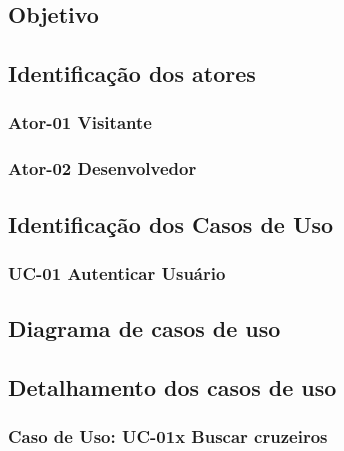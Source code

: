 \subsection{Objetivo}

\subsection{Identificação dos atores}

\subsubsection{Ator-01 Visitante}

\subsubsection{Ator-02 Desenvolvedor}

\subsection{Identificação dos Casos de Uso}

\subsubsection{UC-01 Autenticar Usuário}

\subsection{Diagrama de casos de uso}

\subsection{Detalhamento dos casos de uso}


\subsubsection{Caso de Uso: UC-01x Buscar cruzeiros}
